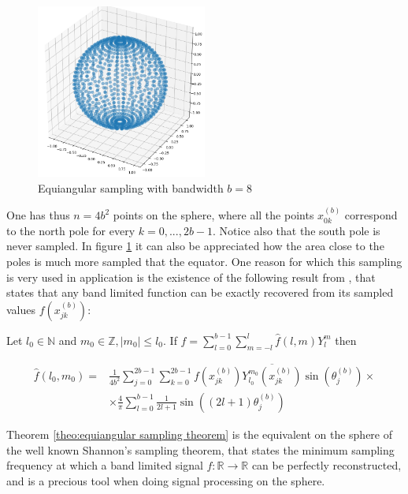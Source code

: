\begin{figure}[h]
	\centering
	\includegraphics[width=0.5\textwidth]{figs/Chapter3/equiangular.png}
	\caption{\label{fig:equiangular sampling}Equiangular sampling with bandwidth $b=8$}
\end{figure}
One has thus $n=4b^2$ points on the sphere, where all the points $x_{0 k}^{(b)}$ correspond to the north pole for every $k=0, ..., 2b-1$. Notice also that the south pole is never sampled. In figure \ref{fig:equiangular sampling} it can also be appreciated how the area close to the poles is much more sampled that the equator. One reason for which this sampling is very used in application is the existence of the following result from \cite{Driscoll:1994:CFT:184069.184073}, that states that any band limited function can be exactly recovered from its sampled values $f\left(x_{j k}^{(b)}\right)$:
\vspace{0.5cm}
\begin{theorem}\label{theo:equiangular sampling theorem}
	Let \(l_{0} \in \mathbb{N}\) and \(m_{0} \in \mathbb{Z},\left|m_{0}\right| \leq l_{0} .\) If \(f=\sum_{l=0}^{b-1} \sum_{m=-l}^{l} \widehat{f}(l, m) Y_{l}^{m}\)
	then
	
	$$
	\begin{aligned} \widehat{f}\left(l_{0}, m_{0}\right)=& \frac{1}{4 b^{2}} \sum_{j=0}^{2 b-1} \sum_{k=0}^{2 b-1} f\left(x_{j k}^{(b)}\right) \overline{Y_{l_{0}}^{m_{0}}\left(x_{j k}^{(b)}\right)} \sin \left(\theta_{j}^{(b)}\right) \times \\ & \times \frac{4}{\pi} \sum_{l=0}^{b-1} \frac{1}{2 l+1} \sin \left((2 l+1) \theta_{j}^{(b)}\right) \end{aligned}
	$$
\end{theorem}
\vspace{0.5cm}
Theorem \ref{theo:equiangular sampling theorem} is the equivalent on the sphere of the well known Shannon's sampling theorem, that states the minimum sampling frequency at which a band limited signal $f:\mathbb R \to \mathbb R$ can be perfectly reconstructed, and is a precious tool when doing signal processing on the sphere.

